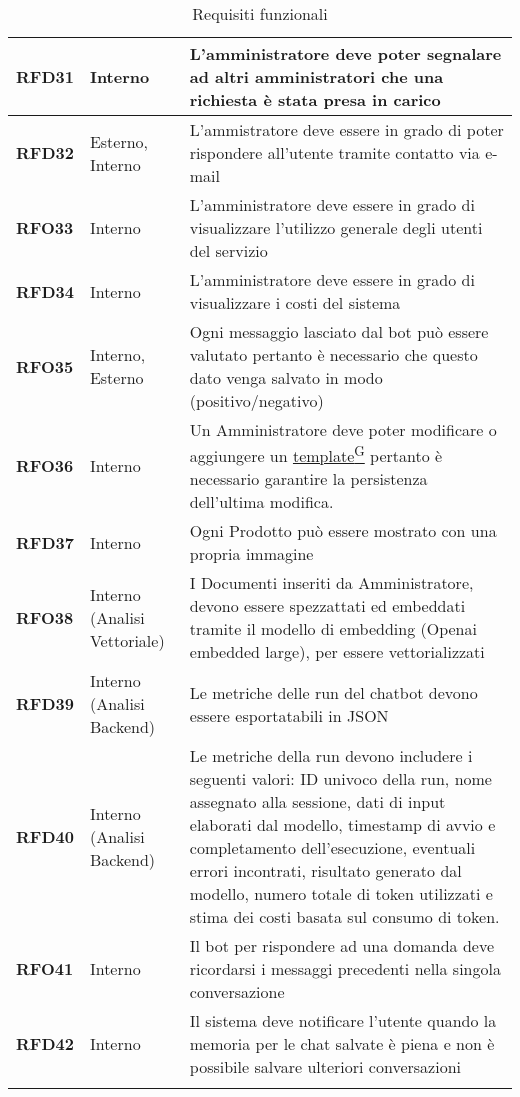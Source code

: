 \begin{longtable}{|>{\centering\arraybackslash}m{}|>{\centering\arraybackslash}m{}|>{\arraybackslash}m{}|}
	\textbf{RFD31} & Interno & L'amministratore deve poter segnalare ad altri amministratori che una richiesta è stata presa in carico\\
	\hline
	\textbf{RFD32} & Esterno, Interno & L'ammistratore deve essere in grado di poter rispondere all'utente tramite contatto via e-mail\\
	\hline
	\textbf{RFO33} & Interno & L'amministratore deve essere in grado di visualizzare l'utilizzo generale degli utenti del servizio\\
	\hline
	\textbf{RFD34} & Interno & L'amministratore deve essere in grado di visualizzare i costi del sistema\\
	\hline
	\textbf{RFO35} & Interno, Esterno & Ogni messaggio lasciato dal bot può essere valutato pertanto è necessario che questo dato venga salvato in modo (positivo/negativo)\\
	\hline 
	\textbf{RFO36} & Interno & Un Amministratore deve poter modificare o aggiungere un \href{https://code7crusaders.github.io/docs/RTB/documentazione_interna/glossario.html#template}{template\textsuperscript{G}} pertanto è necessario garantire la persistenza dell'ultima modifica.\\
	\hline
	\textbf{RFD37} & Interno & Ogni Prodotto può essere mostrato con una propria immagine\\
	\hline
	\textbf{RFO38} & Interno (Analisi Vettoriale) & I Documenti inseriti da Amministratore, devono essere spezzattati ed embeddati tramite il modello di embedding (Openai embedded large), per essere vettorializzati\\
	\hline
	\textbf{RFD39} & Interno (Analisi Backend) & Le metriche delle run del chatbot devono essere esportatabili in JSON\\
	\hline
	\textbf{RFD40} & Interno (Analisi Backend) & Le metriche della run devono includere i seguenti valori: ID univoco della run, nome assegnato alla sessione, dati di input elaborati dal modello, timestamp di avvio e completamento dell'esecuzione, eventuali errori incontrati, risultato generato dal modello, numero totale di token utilizzati e stima dei costi basata sul consumo di token.\\
	\hline
	\textbf{RFO41} & Interno & Il bot per rispondere ad una domanda deve ricordarsi i messaggi precedenti nella singola conversazione\\
	\hline
    \textbf{RFD42} & Interno & Il sistema deve notificare l'utente quando la memoria per le chat salvate è piena e non è possibile salvare ulteriori conversazioni\\
    \hline
	\caption{Requisiti funzionali}
\end{longtable}

